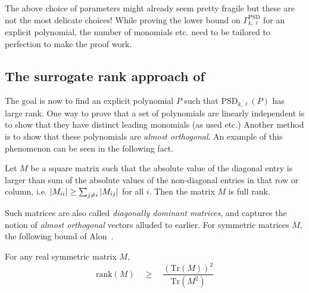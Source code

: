 \documentclass{beatcs}
\newcommand{\rank}{\mathrm{rank}}
\newcommand{\spaced}[1]{\quad#1\quad}
\begin{document}
The above choice of parameters might already seem pretty fragile but these are not the most delicate choices! While proving the lower bound on $\Gamma^{\mathrm{PSD}}_{k,\ell}$ for an explicit polynomial, the number of monomials etc. need to be tailored to perfection to make the proof work. 

\subsection{The surrogate rank approach of \cite{KLSS}}

The goal is now to find an explicit polynomial $P$ such that $\mathrm{PSD}_{k,\ell}(P)$ has large rank. One way to prove that a set of polynomials are linearly independent is to show that they have distinct leading monomials (as used \cite{gkks13} etc.) Another method is to show that these polynomials are \emph{almost orthogonal}. An example of this phenomenon can be seen in the following fact. 

\begin{fact}
Let $M$ be a square matrix such that the absolute value of the diagonal entry is larger than sum of the absolute values of the non-diagonal entries in that row or column, i.e. $\left|M_{ii}\right| \geq \sum_{j\neq i} \left|M_{ij}\right|$ for all $i$. Then the matrix $M$ is full rank. 
\end{fact}

Such matrices are also called \emph{diagonally dominant matrices}, and captures the notion of \emph{almost orthogonal} vectors alluded to earlier. For symmetric matrices $M$, the following bound of Alon~\cite{Alo09}.

\begin{lemma}\label{lem:trace-bound} For any real symmetric matrix $M$, 
\[
\rank(M) \spaced{\geq} \frac{(\mathrm{Tr}(M))^2}{\mathrm{Tr}(M^2)}
\]
\end{lemma}
\end{document}
